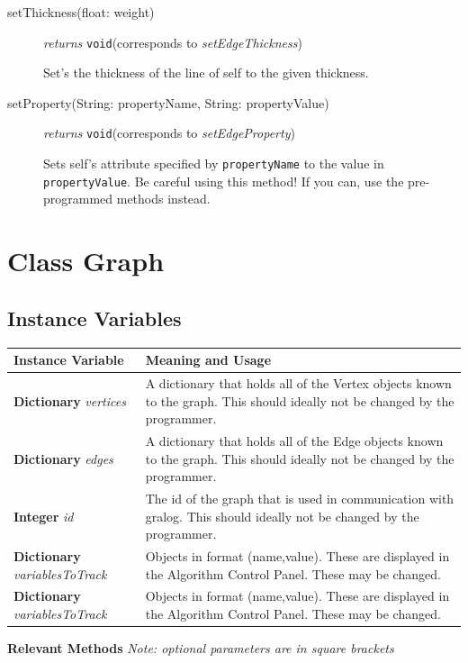 \begin{description}
\label{setEdgeThiccnessClass}\item[setThickness({float: weight})]\emph{returns} \texttt{void}\quad(corresponds to \textit{setEdgeThickness})

Set's the thickness of the line of self to the given thickness.

\label{setEdgePropertyClass}\item[setProperty(String: propertyName, String: propertyValue)] \emph{returns} \texttt{void}\quad(corresponds to \textit{setEdgeProperty})

Sets self's attribute specified by \texttt{propertyName} to the value in \texttt{propertyValue}. Be careful using this method! If you can, use the pre-programmed methods instead.
\end{description}
\section{Class Graph}

\subsection{Instance Variables}


\begin{longtable}{p{\q}p{\q}}
Instance Variable & Meaning and Usage \\ \hline
\textbf{Dictionary} \textit{vertices} & A dictionary that holds all of the Vertex objects known to the graph. This should ideally not be changed by the programmer. \\\hline
\textbf{Dictionary} \textit{edges} & A dictionary that holds all of the Edge objects known to the graph. This should ideally not be changed by the programmer. \\\hline
\textbf{Integer} \textit{id} & The id of the graph that is used in communication with gralog. This should ideally not be changed by the programmer. \\ \hline
\textbf{Dictionary} \textit{variablesToTrack} & Objects in format (name,value). These are displayed in the Algorithm Control Panel. These may be changed. \\ \hline
\textbf{Dictionary} \textit{variablesToTrack} & Objects in format (name,value). These are displayed in the Algorithm Control Panel. These may be changed. \\ \hline
\end{longtable}


\textbf{{\large Relevant Methods}}
\textit{Note: optional parameters are in square brackets}


